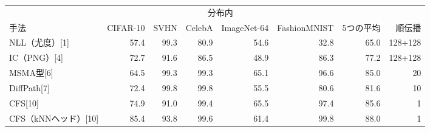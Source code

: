 \documentclass[border=3pt]{standalone}
\newcommand{\R}[1]{\textcolor{tred}{#1}}
\begin{document}
%
\begin{tabular}{l*{5}{r}rr}%
\toprule
 & \multicolumn{5}{c}{分布内} & & \\
\cmidrule(lr){2-6}
手法 & CIFAR-10 & SVHN & CelebA & ImageNet-64 & FashionMNIST & 5つの平均 & 順伝播\\
\midrule
NLL（尤度）[1] & \R{57.4} & 99.3 & 80.9 & \R{54.6} & \R{32.8} & \R{65.0} & 128+128\\
IC（PNG）[4] & 72.7 & 91.6 & 86.5 & \R{48.9} & 86.3 & 77.2 & 128+128\\
MSMA型[6] & \R{64.5} & 99.3 & 99.3 & \R{65.1} & 96.6 & 85.0 & 20\\
DiffPath[7] & 72.4 & 99.8 & 99.8 & \R{55.5} & 80.6 & 81.6 & 10\\
\midrule
CFS[10] & 74.9 & 91.0 & 99.4 & \R{65.5} & 97.4 & 85.6 & 1\\
CFS（kNNヘッド）[10] & 85.4 & 93.8 & 99.6 & \R{61.4} & 99.8 & 88.0 & 1\\
\bottomrule
\end{tabular}%
\end{document}

